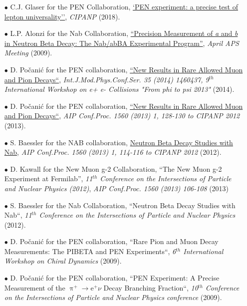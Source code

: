 \documentclass{article}[10pt]
\begin{document}
\begin{itemize}
\item [$\bullet$] C.J. Glaser for the PEN Collaboration, \href{https://inspirehep.net/literature/1706145}{`PEN experiment: a precise test of lepton universality''}, \emph{CIPANP} (2018).



\item [$\bullet$] L.P. Alonzi for the Nab Collaboration, \href{http://nab.phys.virginia.edu/slides/2009_April_APS_Alonzi.pdf}{``Precision Measurement of \emph{a} and \emph{b} in Neutron Beta Decay: The Nab/abBA Experimental Program''}, \emph{April APS Meeting} (2009).



\item [$\bullet$] D. Po\v{c}ani\'c for the PEN collaboration, \href{https://inspirehep.net/literature/1287740}{``New Results in Rare Allowed Muon and Pion Decays``}, \emph{Int.J.Mod.Phys.Conf.Ser. 35 (2014) 1460437, 9$^{th}$ International Workshop on e+ e- Collisions "From phi to psi 2013"} (2014).





\item [$\bullet$] D. Po\v{c}ani\'c for the PEN collaboration, \href{https://inspirehep.net/literature/1191427}{``New Results in Rare Allowed Muon and Pion Decays``}, \emph{AIP Conf.Proc. 1560 (2013) 1, 128-130 to CIPANP 2012} (2013).

\item [$\bullet$] S. Baessler for the NAB collaboration, \href{https://inspirehep.net/literature/1187655}{Neutron Beta Decay Studies with Nab}, \emph{AIP Conf.Proc. 1560 (2013) 1, 114-116 to CIPANP 2012} (2012).









\item [$\bullet$] D. Kawall for the New Muon g-2 Collaboration, ``The New Muon g-2 Experiment at Fermilab'', \emph{11$^{th}$ Conference on the Intersections of Particle and Nuclear Physics (2012)}, \emph{AIP Conf.Proc. 1560 (2013) 106-108} (2013)
\item [$\bullet$] S. Baessler for the Nab Collaboration, ``Neutron Beta Decay Studies with Nab``, \emph{11$^{th}$ Conference on the Intersections of Particle and Nuclear Physics } (2012).
\item [$\bullet$] D. Po\v{c}ani\'c for the PEN collaboration, ``Rare Pion and Muon Decay Measurements: The PIBETA and PEN Experiments``, \emph{6$^{th}$ International Workshop on Chiral Dynamics} (2009).
\item [$\bullet$] D. Po\v{c}ani\'c for the PEN collaboration, ``PEN Experiment: A Precise Measurement of the $\uppi^{+}\rightarrow\mathrm{e}^{+}\nu$ Decay Branching Fraction``, \emph{10$^{th}$ Conference on the Intersections of Particle and Nuclear Physics conference} (2009).


\end{itemize}
\end{document}
